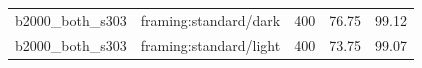 \begin{longtable}{l>{\raggedright\arraybackslash}p{.42\linewidth}rrr}
b2000\_\allowbreak{}both\_\allowbreak{}s303 & %
framing:standard/dark & %
400 & %
76.75 & %
99.12 \\ %

b2000\_\allowbreak{}both\_\allowbreak{}s303 & %
framing:standard/light & %
400 & %
73.75 & %
99.07 \\ %


\end{longtable}
